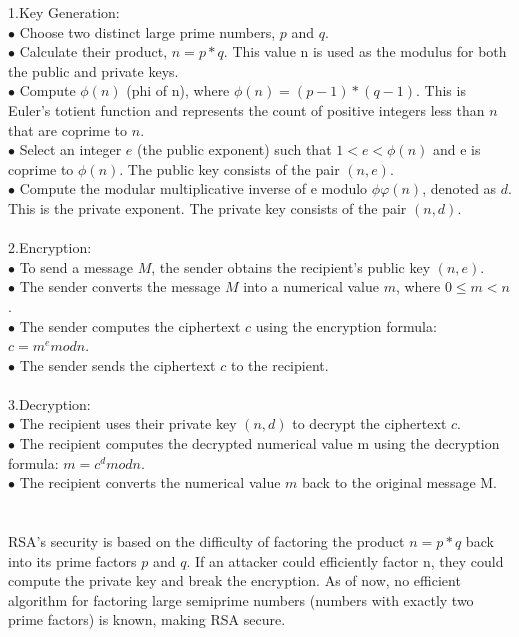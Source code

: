 \documentclass{report}
\begin{document}
1.Key Generation:\\
$\bullet$ Choose two distinct large prime numbers, $p$ and $q$.\\
$\bullet$ Calculate their product, $n = p * q$. This value n is used as the modulus for both the public and private keys.\\
$\bullet$ Compute $\phi(n)$ (phi of n), where $\phi(n) = (p - 1) * (q - 1)$. This is Euler's totient function and represents the count of positive integers less than $n $that are coprime to $n$.\\
$\bullet$ Select an integer $e$ (the public exponent) such that $1 < e < \phi(n)$ and e is coprime to $\phi(n)$. The public key consists of the pair $(n, e)$.\\
$\bullet$ Compute the modular multiplicative inverse of e modulo $\phi$$φ(n)$, denoted as $d$. This is the private exponent. The private key consists of the pair $(n, d)$.\\
\\
2.Encryption:\\
$\bullet$ To send a message $M$, the sender obtains the recipient's public key $(n, e)$.\\
$\bullet$ The sender converts the message $M$ into a numerical value $m$, where $0 \leq m < n$.\\
$\bullet$ The sender computes the ciphertext $c$ using the encryption formula: $c = m^e mod n$.\\
$\bullet$ The sender sends the ciphertext $c$ to the recipient.\\
\\
3.Decryption:\\
$\bullet$ The recipient uses their private key $(n, d)$ to decrypt the ciphertext $c$.\\
$\bullet$ The recipient computes the decrypted numerical value m using the decryption formula: $m = c^d mod n$.\\
$\bullet$ The recipient converts the numerical value $m$ back to the original message M.\\
\\
\\
RSA's security is based on the difficulty of factoring the product $n = p * q$ back into its prime factors $p$ and $q$. If an attacker could efficiently factor n, they could compute the private key and break the encryption. As of now, no efficient algorithm for factoring large semiprime numbers (numbers with exactly two prime factors) is known, making RSA secure.\\
$$
\end{document}

